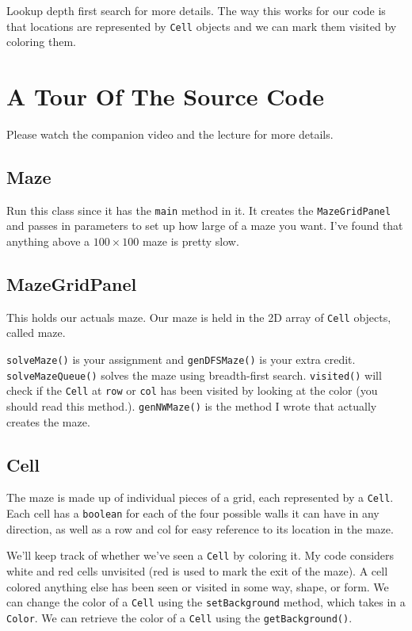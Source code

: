 \documentclass[10pt,letterpaper]{article}
\begin{document}
Lookup depth first search for more details.
The way this works for our code is that locations are represented by \texttt{Cell} objects and we can mark them visited by coloring them.
	
	
\section{A Tour Of The Source Code}
	
	Please watch the companion video and the lecture for more details.
	
	\subsection{Maze}
	Run this class since it has the \texttt{main} method in it.
	It creates the \texttt{MazeGridPanel} and passes in parameters to set up how large of a maze you want.
	I've found that anything above a $ 100 \times 100 $ maze is pretty slow.
	
	\subsection{MazeGridPanel}
	
	This holds our actuals maze.
	Our maze is held in the 2D array of \texttt{Cell} objects, called maze.
	
	\texttt{solveMaze()} is your assignment and \texttt{genDFSMaze()} is your extra credit.
	\texttt{solveMazeQueue()} solves the maze using breadth-first search.
	\texttt{visited()} will check if the \texttt{Cell} at \texttt{row} or \texttt{col} has been visited by looking at the color (you should read this method.).
	\texttt{genNWMaze()} is the method I wrote that actually creates the maze.
	
	
	\subsection{Cell}
	The maze is made up of individual pieces of a grid, each represented by a \texttt{Cell}.
	Each cell has a \texttt{boolean} for each of the four possible walls it can have in any direction, as well as a row and col for easy reference to its location in the maze.
	
	We'll keep track of whether we've seen a \texttt{Cell} by coloring it.
	My code considers white and red cells unvisited (red is used to mark the exit of the maze).
	A cell colored anything else has been seen or visited in some way, shape, or form.
	We can change the color of a \texttt{Cell} using the \texttt{setBackground}  method, which takes in a \texttt{Color}.
	We can retrieve the color of a \texttt{Cell} using the \texttt{getBackground()}.
	
\end{document}

